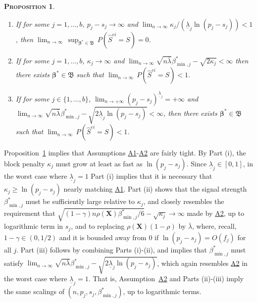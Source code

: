 \documentclass[
  12pt]{article}
\providecommand{\tightlist}{%
  \setlength{\itemsep}{0pt}\setlength{\parskip}{0pt}}\usepackage{longtable,booktabs,array}
\newcommand{\bbeta}{\boldsymbol{\beta}}
\newcommand{\bX}{\mathbf{X}}
\newtheorem{prop}[thm]{\textsc{Proposition}}
\begin{document}
\begin{prop}\label{prop:nectypeItypeII}
 \begin{enumerate}[label=(\roman*)]\tightlist
    \item If for some $j=1,\ldots,b$, $p_j-s_j\to\infty$ and $\lim_{n\to\infty}\kappa_j/(\underline{\lambda}_j\ln(p_j-s_j)) <1$, then 
     $\lim_{n \to \infty} \, \sup_{\bbeta^*\in\mathfrak{B}}\, P(\hat{S}^{ei}=S)= 0$.
    \item If for some $j=1,\ldots,b$, $\kappa_j\to\infty$  and
      $\lim_{n\to \infty}\sqrt{n\bar{\lambda}}\beta_{\min,j}^*-\sqrt{2\kappa_j} < \infty$ then \color{green}there exists $\bbeta^*\in\mathfrak{B}$ such that \color{black} $\lim_{n \to \infty} \, P(\hat{S}^{ei} = S) < 1$.
    \item If for some $j\in\{1,\ldots,b\}$,   $\lim_{n\to+\infty}(p_j-s_j)^{\underline{\lambda}_j}=+\infty$ and $\lim_{n\to\infty}\sqrt{n\bar{\lambda}}\beta_{\min,j}^*-\sqrt{2\underline{\lambda}_j\ln(p_j-s_j)} < \infty$, then \color{green}there exists $\bbeta^*\in\mathfrak{B}$ such that \color{black}$\lim_{n \to \infty} \,P(\hat{S}^{ei}=S) < 1$.
\end{enumerate}
\end{prop}

Proposition~\ref{prop:nectypeItypeII} implies that Assumptions \hyperlink{lab:A1}{A1}-\hyperlink{lab:A2}{A2} are fairly tight. By Part (i), the block penalty $\kappa_j$ must grow at least as fast as $\ln(p_j-s_j)$.
Since $\underline{\lambda}_j \in [0,1]$, in the worst case where $\underline{\lambda}_j=1$ Part (i) implies that it is necessary that 
$\kappa_j \geq \ln(p_j-s_j)$
nearly matching \hyperlink{lab:A1}{A1}. 
Part (ii) shows that the signal strength $\beta_{\min,j}^*$ must be sufficiently large relative to $\kappa_j$, and closely resembles the requirement that $\sqrt{(1-\gamma) n \rho(\bX) \beta_{\min,j}^*/6} - \sqrt{\kappa_j} \to \infty$ made by \hyperlink{lab:A2}{A2},
up to logarithmic term in $s_j$, and to replacing $\rho(\bX) (1 - \rho)$ by $\bar{\lambda}$, where, recall, $1-\gamma \in (0,1/2)$ \color{green}and it is bounded away from 0 if $\ln(p_j-s_j)=O(f_j)$ for all $j$\color{black}.
Part (iii) follows by combining Parts (i)-(ii), and implies that $\beta_{\min,j}^*$ must satisfy
$\lim_{n\to\infty}\sqrt{n\bar{\lambda}}\beta_{\min,j}^*-\sqrt{ 2\underline{\lambda}_j\ln(p_j-s_j)}$,
which again resembles \hyperlink{lab:A2}{A2} in the worst case where $\underline{\lambda}_j=1$.
That is, Assumption~\hyperlink{lab:A2}{A2} and Parts (ii)-(iii) imply the same scalings of $(n,p_j,s_j,\beta_{\min,j}^*)$, up to logarithmic terms.
\end{document}

